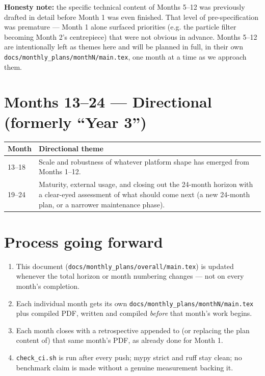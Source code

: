 \documentclass[11pt]{article}
\begin{document}
\textbf{Honesty note:} the specific technical content of Months 5--12
was previously drafted in detail before Month 1 was even finished. That
level of pre-specification was premature --- Month 1 alone surfaced
priorities (e.g. the particle filter becoming Month 2's centrepiece)
that were not obvious in advance. Months 5--12 are intentionally left
as themes here and will be planned in full, in their own
\texttt{docs/monthly\_plans/monthN/main.tex}, one month at a time as we
approach them.

\section*{Months 13--24 --- Directional (formerly ``Year 3'')}

\begin{longtable}{p{1.3cm}p{11.9cm}}
\toprule
\textbf{Month} & \textbf{Directional theme} \\
\midrule
\endhead
13--18 & Scale and robustness of whatever platform shape has emerged
  from Months 1--12. \\
19--24 & Maturity, external usage, and closing out the 24-month
  horizon with a clear-eyed assessment of what should come next (a new
  24-month plan, or a narrower maintenance phase). \\
\bottomrule
\end{longtable}

\section*{Process going forward}
\begin{enumerate}[leftmargin=*]
  \item This document (\texttt{docs/monthly\_plans/overall/main.tex}) is
    updated whenever the total horizon or month numbering changes ---
    not on every month's completion.
  \item Each individual month gets its own
    \texttt{docs/monthly\_plans/monthN/main.tex} plus compiled PDF,
    written and compiled \emph{before} that month's work begins.
  \item Each month closes with a retrospective appended to (or replacing
    the plan content of) that same month's PDF, as already done for
    Month 1.
  \item \texttt{check\_ci.sh} is run after every push; mypy strict and
    ruff stay clean; no benchmark claim is made without a genuine
    measurement backing it.
\end{enumerate}
\end{document}
